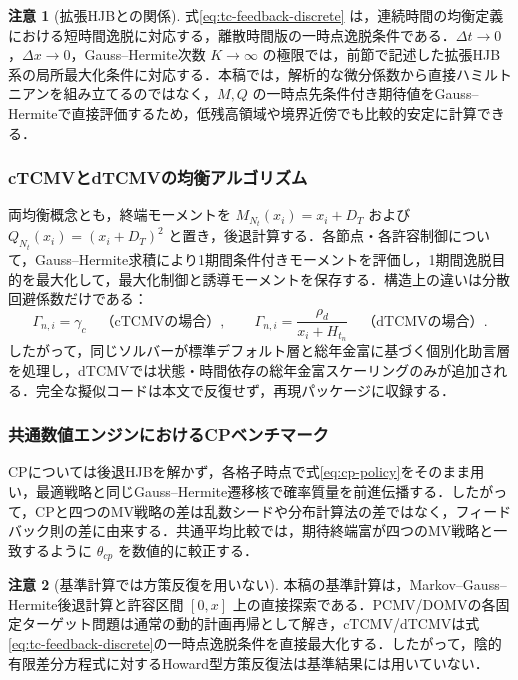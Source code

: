 \documentclass[10pt,a4paper]{article}
\theoremstyle{plain}
\theoremstyle{definition}
\newtheorem{remark}{注意}
\begin{document}
\begin{remark}[拡張HJBとの関係]
式\eqref{eq:tc-feedback-discrete} は，連続時間の均衡定義における短時間逸脱に対応する，離散時間版の一時点逸脱条件である．$\Delta t\to0$，$\Delta x\to0$，Gauss--Hermite次数 $K\to\infty$ の極限では，前節で記述した拡張HJB系の局所最大化条件に対応する．本稿では，解析的な微分係数から直接ハミルトニアンを組み立てるのではなく，$M,Q$ の一時点先条件付き期待値をGauss--Hermiteで直接評価するため，低残高領域や境界近傍でも比較的安定に計算できる．
\end{remark}

\subsubsection{cTCMVとdTCMVの均衡アルゴリズム}
両均衡概念とも，終端モーメントを $M_{N_t}(x_i)=x_i+D_T$ および $Q_{N_t}(x_i)=(x_i+D_T)^2$ と置き，後退計算する．各節点・各許容制御について，Gauss--Hermite求積により1期間条件付きモーメントを評価し，1期間逸脱目的を最大化して，最大化制御と誘導モーメントを保存する．構造上の違いは分散回避係数だけである：
\begin{equation}
\Gamma_{n,i}=\gamma_c\quad\text{（cTCMVの場合）},
\qquad
\Gamma_{n,i}=\frac{\rho_d}{x_i+H_{t_n}}\quad\text{（dTCMVの場合）}.
\label{eq:gamma-grid-compact}
\end{equation}
したがって，同じソルバーが標準デフォルト層と総年金富に基づく個別化助言層を処理し，dTCMVでは状態・時間依存の総年金富スケーリングのみが追加される．完全な擬似コードは本文で反復せず，再現パッケージに収録する．




\subsubsection{共通数値エンジンにおけるCPベンチマーク}

CPについては後退HJBを解かず，各格子時点で式\eqref{eq:cp-policy}をそのまま用い，最適戦略と同じGauss--Hermite遷移核で確率質量を前進伝播する．したがって，CPと四つのMV戦略の差は乱数シードや分布計算法の差ではなく，フィードバック則の差に由来する．共通平均比較では，期待終端富が四つのMV戦略と一致するように $\theta_{cp}$ を数値的に較正する．

\begin{remark}[基準計算では方策反復を用いない]
本稿の基準計算は，Markov--Gauss--Hermite後退計算と許容区間 $[0,x]$ 上の直接探索である．PCMV/DOMVの各固定ターゲット問題は通常の動的計画再帰として解き，cTCMV/dTCMVは式\eqref{eq:tc-feedback-discrete}の一時点逸脱条件を直接最大化する．したがって，陰的有限差分方程式に対するHoward型方策反復法は基準結果には用いていない．
\end{remark}
\end{document}
